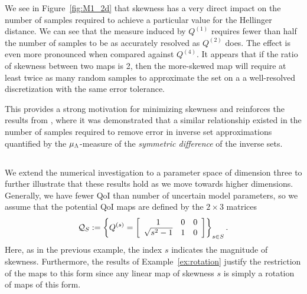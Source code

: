 We see in Figure~\ref{fig:M1_2d} that skewness has a very direct impact on the number of samples required to achieve a particular value for the Hellinger distance. 
We can see that the measure induced by $Q^{(1)}$ requires fewer than half the number of samples to be as accurately resolved as $Q^{(2)}$ does. 
The effect is even more pronounced when compared against $Q^{(4)}$.
It appears that if the ratio of skewness between two maps is 2, then the more-skewed map will require at least twice as many random samples to approximate the set on a a well-resolved discretization with the same error tolerance.

This provides a strong motivation for minimizing skewness and reinforces the results from \cite{BPW_2015}, where it was demonstrated that a similar relationship existed in the number of samples required to remove error in inverse set approximations quantified by the $\mu_\pspace$-measure of the {\em symmetric difference} of the inverse sets.



\subsection{}\label{ex:3dmap}
We extend the numerical investigation to a parameter space of dimension three to further illustrate that these results hold as we move towards higher dimensions.
Generally, we have fewer QoI than number of uncertain model parameters, so we assume that the potential QoI maps are defined by the $2\times 3$ matrices
\begin{equation}\label{eq:qmap3}
\qspace_S := \left \lbrace Q^{(s)} =  \mat{ccc}{1 & 0 & 0\\ \sqrt{s^2 - 1}& 1 & 0} \right \rbrace_{s\in S}.
\end{equation}
Here, as in the previous example, the index $s$ indicates the magnitude of skewness.
Furthermore, the results of Example~\ref{ex:rotation} justify the restriction of the maps to this form since any linear map of skewness $s$ is simply a rotation of maps of this form.

%
%

